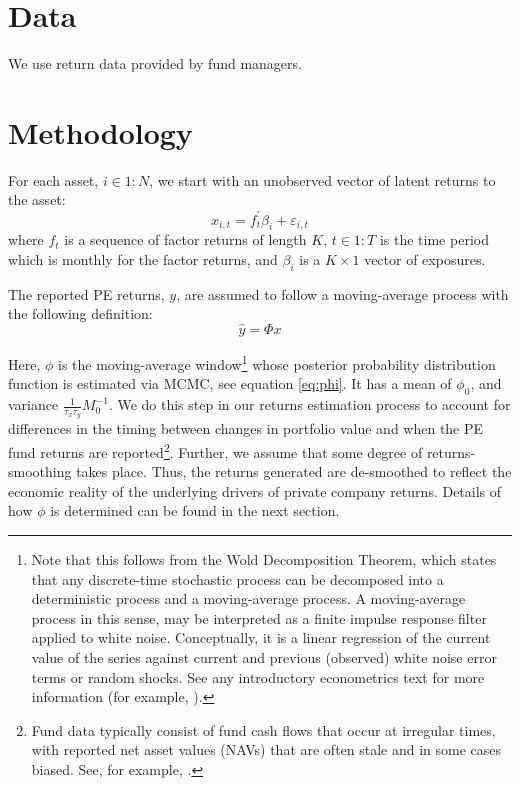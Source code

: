 \documentclass[11pt]{article}
\begin{document}
\section{Data} 
\label{sec:data}

We use return data provided by fund managers.

\section{Methodology}
\label{sec:methodology}
For each asset, $i \in 1:N$, we start with an unobserved vector of latent returns to the asset:
\begin{equation}
\label{eq:x_i}
	x_{i,t} = f_t^\prime \beta_i + \varepsilon_{i,t}
\end{equation}
where $f_t$ is a sequence of factor returns of length $K$, $t \in 1:T$ is the time period which is monthly for the factor returns, and $\beta_i$ is a $K \times 1$ vector of exposures.

The reported PE returns, $y$, are assumed to follow a moving-average process with the following definition:
\begin{equation}
\label{eq:y_hat}
	\hat{y} = \Phi x %
\end{equation}

Here, $\phi$ is the moving-average window\footnote{Note that this follows from the Wold Decomposition Theorem, which states that any discrete-time stochastic process can be decomposed into a deterministic process and a moving-average process. A moving-average process in this sense, may be interpreted as a finite impulse response filter applied to white noise. Conceptually, it is a linear regression of the current value of the series against current and previous (observed) white noise error terms or random shocks. See any introductory econometrics text for more information (for example, \cite{Brooks2019}).}  whose posterior probability distribution function is estimated via MCMC, see equation \eqref{eq:phi}. It has a mean of $\phi_0$, and variance $\frac{1}{\tau_x \tau_y} M_0^{-1} $. We do this step in our returns estimation process to account for differences in the timing between changes in portfolio value and when the PE fund returns are reported\footnote{Fund data typically consist of fund cash flows that occur at irregular times, with reported net asset values (NAVs) that are often stale and in some cases biased. See, for example, \cite{Korteweg2019}.}. Further, we assume that some degree of returns-smoothing takes place. Thus, the returns generated are de-smoothed to reflect the economic reality of the underlying drivers of private company returns. Details of how $\phi$ is determined can be found in the next section.
\end{document}
